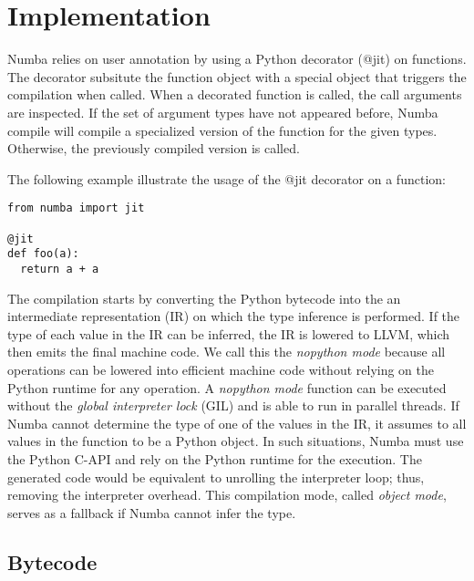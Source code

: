 \documentclass{acm_proc_article-sp}
\begin{document}
\section{Implementation}

Numba relies on user annotation by using a Python decorator (@jit) on functions.
The decorator subsitute the function object with a special object that triggers
the compilation when called. When a decorated function is called,
the call arguments are inspected. If the set of argument types have not appeared
before, Numba compile will compile a specialized version of the function for the
given types. Otherwise, the previously compiled version is called.

The following example illustrate the usage of the @jit decorator on a function:


\begin{lstlisting}
from numba import jit

@jit
def foo(a):
  return a + a
\end{lstlisting}

The compilation starts by converting the Python bytecode into the an
intermediate representation (IR) on which the type inference is
performed. If the type of each value in the IR can be inferred, the IR
is lowered to LLVM, which then emits the final machine code.  We call
this the \textit{nopython mode} because all operations can be lowered
into efficient machine code without relying on the Python runtime for
any operation.  A \textit{nopython mode} function can be executed
without the \textit{global interpreter lock} (GIL) and is able to run
in parallel threads.  If Numba cannot determine the type of one of the
values in the IR, it assumes to all values in the function to be a
Python object. In such situations, Numba must use the Python C-API and
rely on the Python runtime for the execution. The generated code would
be equivalent to unrolling the interpreter loop; thus, removing the
interpreter overhead.  This compilation mode, called \textit{object
  mode}, serves as a fallback if Numba cannot infer the type.

\subsection{Bytecode}
\end{document}

